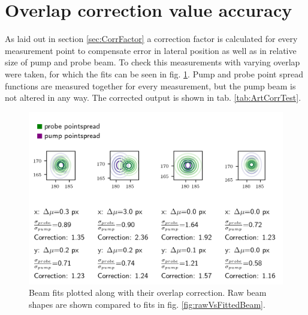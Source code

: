 \documentclass[twoside,openright]{scrreprt}
\begin{document}
{\section{Overlap correction value accuracy}
As laid out in section \ref{sec:CorrFactor} a correction factor is calculated for every measurement point to compensate error in lateral position as well as in relative size of pump and probe beam.
To check this measurements with varying overlap were taken, for which the fits can be seen in fig. \ref{fig:correctionComparison}.
Pump and probe point spread functions are measured together for every measurement, but the pump beam is not altered in any way. The corrected output is shown in tab. \ref{tab:ArtCorrTest}. 
\begin{figure}[!h]
\centering
\includegraphics[width=\linewidth]{images/CorrectionComparison.png}
\caption{Beam fits plotted along with their overlap correction. Raw beam shapes are shown compared to fits in fig. \ref{fig:rawVsFittedBeam}.\label{fig:correctionComparison}}
\end{figure}



}
\end{document}
